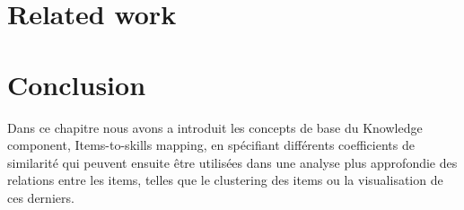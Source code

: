 \section{Related work}

\section{Conclusion} 
Dans ce chapitre nous avons a introduit les concepts de base du Knowledge component, Items-to-skills mapping, en spécifiant différents coefficients de similarité qui peuvent ensuite être utilisées dans une analyse plus approfondie des relations entre les items, telles que le clustering des items ou la visualisation de ces derniers.